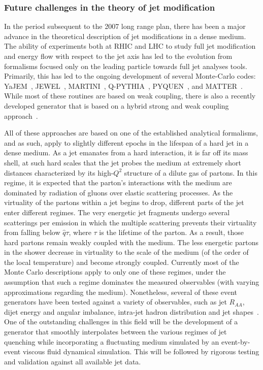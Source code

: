 \subsubsection{Future challenges in the theory of jet modification}
\label{Sec:FutureJetTheoryChallenges}

In the period subsequent to the 2007 long range plan, there has been a major advance in the theoretical description 
of jet modifications in a dense medium. The ability of experiments both at RHIC and LHC to study full jet modification and 
energy flow with respect to the jet axis has led to the evolution from formalisms focused only on the leading particle towards full jet analyses tools.
Primarily, this has led to the ongoing development of several Monte-Carlo codes: YaJEM~\cite{Renk:2008pp,Renk:2010zx}, JEWEL~\cite{Zapp:2008gi}, MARTINI~\cite{Schenke:2009gb}, Q-PYTHIA~\cite{Armesto:2009fj}, PYQUEN~\cite{Lokhtin:2011qq}, and MATTER~\cite{Majumder:2013re}. While most of these routines are based on weak coupling, there is also a recently developed generator that is based on a hybrid strong and weak coupling approach~\cite{Casalderrey-Solana:2014bpa}. 

All of these approaches are based on one of the established analytical formalisms, and as such, apply to slightly different epochs in the lifespan of a hard jet in a dense medium. As a jet emanates from a hard interaction, it is far off its mass shell, at such hard scales that the jet probes the medium at extremely short distances characterized by its high-$Q^{2}$ 
structure of a dilute gas of partons. In this regime, it is expected that the parton's interactions with the medium are
dominated by radiation of gluons over elastic scattering processes.  
As the virtuality of the partons within a jet begins to drop, different parts of the jet enter different regimes.
The very energetic jet fragments undergo several scatterings per emission in which the multiple scattering prevents their virtuality from falling
below $\hat{q} \tau$, where $\tau$ is the lifetime of 
the parton.
As a result, those hard partons remain weakly coupled with the medium. 
The less energetic partons in the shower decrease in virtuality to the scale of the medium 
(of the order of the local temperature) and become strongly coupled. 
Currently most of the Monte Carlo descriptions apply to only one of these regimes, under the assumption that such a regime dominates the measured observables (with varying approximations regarding the medium). 
Nonetheless, several of these event generators have been tested against a variety of observables, 
such as jet $R_{AA}$,
dijet energy and angular imbalance, 
intra-jet hadron distribution and jet shapes~\cite{Renk:2013rla,Renk:2012cb,Ramos:2014mba,Zapp:2012ak,Young:2012dv,Majumder:2013re}. 
One of the outstanding challenges in this field will be the development of a generator that smoothly interpolates between the various regimes of jet quenching while incorporating a fluctuating medium simulated by an event-by-event viscous fluid dynamical simulation. This will be followed by rigorous testing and validation against all available 
jet data. 


